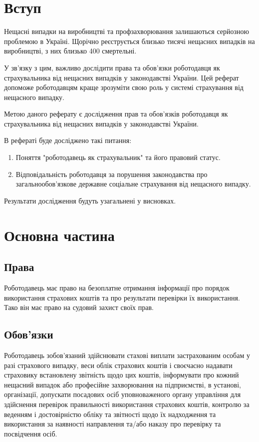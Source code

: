 \section*{Вступ}

Нещасні випадки на виробництві та профзахворювання залишаються серйозною проблемою в Україні. Щорічно реєструється близько тисячі нещасних випадків на виробництві, з них близько 400 смертельні.

У зв'язку з цим, важливо дослідити права та обов'язки роботодавця як страхувальника від нещасних випадків у законодавстві України. 
Цей реферат допоможе роботодавцям краще зрозуміти свою роль у системі страхування від нещасного випадку.

Метою даного реферату є дослідження прав та обов'язків роботодавця як страхувальника від нещасних випадків у законодавстві України.

В рефераті буде досліджено такі питання:
\begin{enumerate}

    \item Поняття "роботодавець як страхувальник" та його правовий статус.

    \item Відповідальність роботодавця за порушення законодавства про загальнообов'язкове державне соціальне страхування від нещасного випадку.

\end{enumerate}
Результати дослідження будуть узагальнені у висновках.



\section*{Основна частина}

\subsection*{Права}

Роботодавець має право на безоплатне отримання інформації про порядок використання страхових коштів та про результати перевірки їх використання. Тако він має право на судовий захист своїх прав.

\subsection*{Обов'язки}

Роботодавець зобов'язаний здійснювати стахові виплати застрахованим особам у разі страхового випадку, веси облік страхових коштів і своєчасно надавати страховику встановлену звітність щодо цих коштів, інформувати про кожний нещасний випадок або професійне захворювання на підприємстві, в установі, організації, допускати посадових осіб уповноваженого органу управління для здійснення перевірок правильності використання страхових коштів, контролю за веденням і достовірністю обліку та звітності щодо їх надходження та використання за наявності направлення та/або наказу про перевірку та посвідчення осіб.


